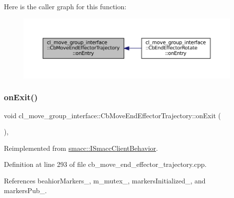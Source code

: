 Here is the caller graph for this function\+:
\nopagebreak
\begin{figure}[H]
\begin{center}
\leavevmode
\includegraphics[width=350pt]{classcl__move__group__interface_1_1CbMoveEndEffectorTrajectory_aaedd074fd178c6390a4a3f1ccff23ad3_icgraph}
\end{center}
\end{figure}
\mbox{\label{classcl__move__group__interface_1_1CbMoveEndEffectorTrajectory_a4952c092e69bc6e9831568de32888da5}} 
\subsubsection{\texorpdfstring{on\+Exit()}{onExit()}}
{\footnotesize\ttfamily void cl\+\_\+move\+\_\+group\+\_\+interface\+::\+Cb\+Move\+End\+Effector\+Trajectory\+::on\+Exit (\begin{DoxyParamCaption}{ }\end{DoxyParamCaption})\hspace{0.3cm}{\ttfamily [override]}, {\ttfamily [virtual]}}



Reimplemented from \hyperlink{classsmacc_1_1ISmaccClientBehavior_a36bf771905e3bf750909a15e4215a9b3}{smacc\+::\+I\+Smacc\+Client\+Behavior}.



Definition at line 293 of file cb\+\_\+move\+\_\+end\+\_\+effector\+\_\+trajectory.\+cpp.



References beahior\+Markers\+\_\+, m\+\_\+mutex\+\_\+, markers\+Initialized\+\_\+, and markers\+Pub\+\_\+.


